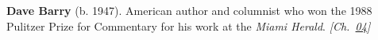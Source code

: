 \textbf{Dave Barry} (b. 1947). American author and columnist who won the 1988 Pulitzer Prize for Commentary for his work at the \emph{Miami Herald}. \emph{[Ch.~\hyperref[ch:energytransmission]{04}]}

